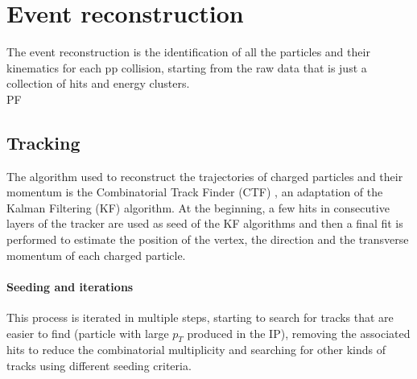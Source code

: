 
\label{sec:RECO}
\minitoc

\section{Event reconstruction}
The event reconstruction is the identification of all the particles and their kinematics for each pp collision, starting from the raw data that is just a collection of hits and energy clusters.\\
PF
\ADDREF 
\subsection{Tracking}
The algorithm used to reconstruct the trajectories of charged particles and their momentum is the Combinatorial Track Finder (CTF) \ADDREF, an adaptation of the Kalman Filtering (KF) \ADDREF algorithm.
At the beginning, a few hits in consecutive layers of the tracker are used as seed of the KF algorithms and then a final fit is performed to estimate the position of the vertex, the direction and the transverse momentum of each charged particle.\\

\paragraph*{Seeding and iterations}
This process is iterated in multiple steps, starting to search for tracks that are easier to find (\eg particle with large $p_T$ produced in the IP), removing the associated hits to reduce the combinatorial multiplicity and searching for other kinds of tracks using different seeding criteria.


